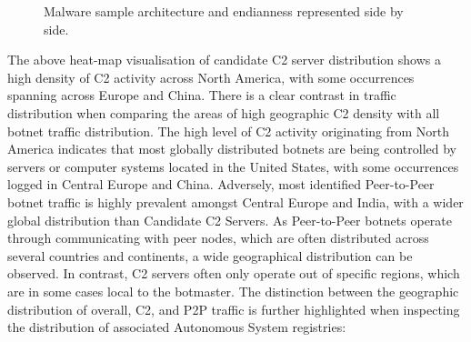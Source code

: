 \begin{figure}[!htb]
    \centering
    \qquad
    \caption{Malware sample architecture and endianness represented side by side.}
    \label{fig:p2p_c2_heatmaps}
\end{figure}

The above heat-map visualisation of candidate C2 server distribution shows a high density of C2 activity across North America, with some occurrences spanning across Europe and China. There is a clear contrast in traffic distribution when comparing the areas of high geographic C2 density with all botnet traffic distribution. The high level of C2 activity originating from North America indicates that most globally distributed botnets are being controlled by servers or computer systems located in the United States, with some occurrences logged in Central Europe and China. Adversely, most identified Peer-to-Peer botnet traffic is highly prevalent amongst Central Europe and India, with a wider global distribution than Candidate C2 Servers. As Peer-to-Peer botnets operate through communicating with peer nodes, which are often distributed across several countries and continents, a wide geographical distribution can be observed. In contrast, C2 servers often only operate out of specific regions, which are in some cases local to the botmaster. The distinction between the geographic distribution of overall, C2, and P2P traffic is further highlighted when inspecting the distribution of associated Autonomous System registries:


